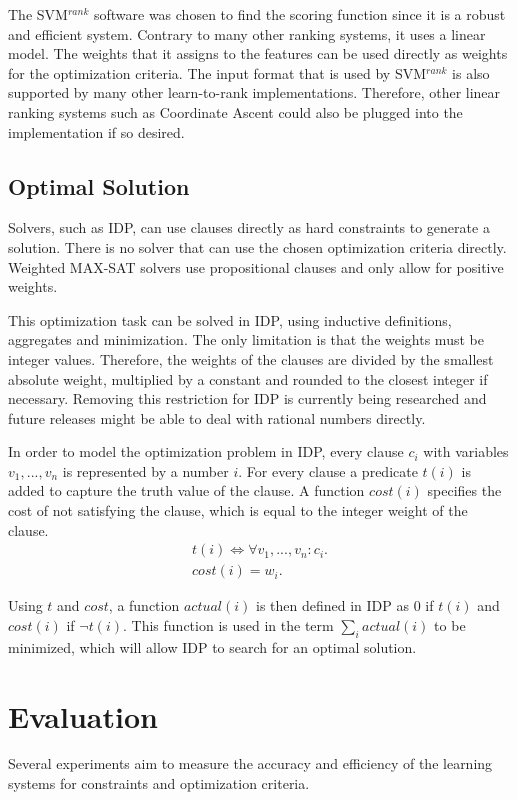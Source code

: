\documentclass[letterpaper]{article}
\newcommand{\svm}{SVM$^{rank}$}
\theoremstyle{definition}
\begin{document}
The \svm{} software was chosen to find the scoring function since it is a robust and efficient system.
Contrary to many other ranking systems, it uses a linear model.
The weights that it assigns to the features can be used directly as weights for the optimization criteria.
The input format that is used by \svm{} is also supported by many other learn-to-rank implementations.
Therefore, other linear ranking systems such as Coordinate Ascent \cite{metzler2007linear} could also be plugged into the implementation if so desired.

\subsection{Optimal Solution}
Solvers, such as IDP, can use clauses directly as hard constraints to generate a solution.
There is no solver that can use the chosen optimization criteria directly.
Weighted MAX-SAT solvers use propositional clauses and only allow for positive weights.

This optimization task can be solved in IDP, using inductive definitions, aggregates and minimization.
The only limitation is that the weights must be integer values.
Therefore, the weights of the clauses are divided by the smallest absolute weight, multiplied by a constant and rounded to the closest integer if necessary.
Removing this restriction for IDP is currently being researched and future releases might be able to deal with rational numbers directly.

In order to model the optimization problem in IDP, every clause $c_i$ with variables $v_1, ..., v_n$ is represented by a number $i$. For every clause a predicate $t(i)$ is added to capture the truth value of the clause.
A function $\mathit{cost}(i)$ specifies the cost of not satisfying the clause, which is equal to the integer weight of the clause.
\begin{eqnarray*}
  t(i) \Leftrightarrow \forall v_1, ..., v_n : c_i. \\
  cost(i) = w_i.
\end{eqnarray*}

Using $t$ and $\mathit{cost}$, a function $\mathit{actual}(i)$ is then defined in IDP as 0 if $t(i)$ and $\mathit{cost}(i)$ if $\lnot t(i)$.
This function is used in the term $\sum_i actual(i)$ to be minimized, which will allow IDP to search for an optimal solution.

\section{Evaluation}
Several experiments aim to measure the accuracy and efficiency of the learning systems for constraints and optimization criteria.
\end{document}
